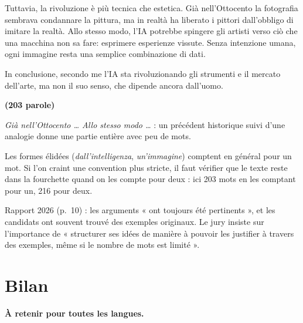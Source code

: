 \documentclass[11pt,a4paper]{article}
\begin{document}
Tuttavia, la rivoluzione è più tecnica che estetica. Già nell'Ottocento la fotografia sembrava condannare la pittura, ma in realtà ha liberato i pittori dall'obbligo di imitare la realtà. Allo stesso modo, l'IA potrebbe spingere gli artisti verso ciò che una macchina non sa fare: esprimere esperienze vissute. Senza intenzione umana, ogni immagine resta una semplice combinazione di dati.

In conclusione, secondo me l'IA sta rivoluzionando gli strumenti e il mercato dell'arte, ma non il suo senso, che dipende ancora dall'uomo.

\textbf{(203 parole)}

\begin{methode}

\emph{Già nell'Ottocento \ldots{} Allo stesso modo \ldots{}} : un précédent historique suivi d'une analogie donne une partie entière avec peu de mots.

\end{methode}

\begin{piege}

Les formes élidées (\emph{dall'intelligenza}, \emph{un'immagine}) comptent en général pour un mot. Si l'on craint une convention plus stricte, il faut vérifier que le texte reste dans la fourchette quand on les compte pour deux : ici 203 mots en les comptant pour un, 216 pour deux.

\end{piege}

\begin{jury}

Rapport 2026 (p.~10) : les arguments « ont toujours été pertinents », et les candidats ont souvent trouvé des exemples originaux. Le jury insiste sur l'importance de « structurer ses idées de manière à pouvoir les justifier à travers des exemples, même si le nombre de mots est limité ».

\end{jury}

\hypertarget{bilan}{%
\section{Bilan}\label{bilan}}

\textbf{À retenir pour toutes les langues.}
\end{document}
